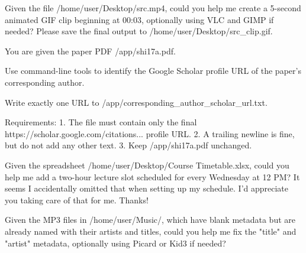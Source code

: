\documentclass{llmxive}
\begin{document}
\begin{instructionbox}
Given the file \textasciigrave{}/home/user/Desktop/src.mp4\textasciigrave{}, could you help me create a 5-second animated GIF clip beginning at 00:03, optionally using VLC and GIMP if needed? Please save the final output to \textasciigrave{}/home/user/Desktop/src\_clip.gif\textasciigrave{}.
\end{instructionbox}

\begin{instructionbox}
You are given the paper PDF \textasciigrave{}/app/shi17a.pdf\textasciigrave{}.

Use command-line tools to identify the Google Scholar profile URL of the paper's corresponding author.

Write exactly one URL to \textasciigrave{}/app/corresponding\_author\_scholar\_url.txt\textasciigrave{}.

Requirements:
1. The file must contain only the final \textasciigrave{}https://scholar.google.com/citations...\textasciigrave{} profile URL.
2. A trailing newline is fine, but do not add any other text.
3. Keep \textasciigrave{}/app/shi17a.pdf\textasciigrave{} unchanged.
\end{instructionbox}

\begin{instructionbox}
Given the spreadsheet \textasciigrave{}/home/user/Desktop/Course Timetable.xlsx\textasciigrave{}, could you help me add a two-hour lecture slot scheduled for every Wednesday at 12 PM? It seems I accidentally omitted that when setting up my schedule. I'd appreciate you taking care of that for me. Thanks!
\end{instructionbox}

\begin{instructionbox}
Given the MP3 files in \textasciigrave{}/home/user/Music/\textasciigrave{}, which have blank metadata but are already named with their artists and titles, could you help me fix the "title" and "artist" metadata, optionally using Picard or Kid3 if needed?
\end{instructionbox}
\end{document}
